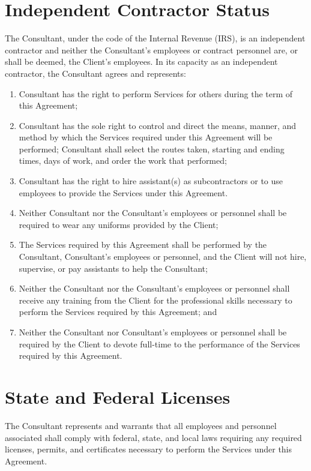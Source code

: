 \documentclass{article}
\begin{document}
\section{Independent Contractor Status}
The Consultant, under the code of the Internal Revenue (IRS), is an independent contractor and neither the Consultant's employees or contract personnel are, or shall be deemed, the Client's employees. In its capacity as an independent contractor, the Consultant agrees and represents:
\begin{enumerate}
    \item Consultant has the right to perform Services for others during the term of this Agreement;
    \item Consultant has the sole right to control and direct the means, manner, and method by which the Services required under this Agreement will be performed; Consultant shall select the routes taken, starting and ending times, days of work, and order the work that performed;
    \item Consultant has the right to hire assistant(s) as subcontractors or to use employees to provide the Services under this Agreement.
    \item Neither Consultant nor the Consultant's employees or personnel shall be required to wear any uniforms provided by the Client;
    \item The Services required by this Agreement shall be performed by the Consultant, Consultant's employees or personnel, and the Client will not hire, supervise, or pay assistants to help the Consultant;
    \item Neither the Consultant nor the Consultant's employees or personnel shall receive any training from the Client for the professional skills necessary to perform the Services required by this Agreement; and
    \item Neither the Consultant nor Consultant's employees or personnel shall be required by the Client to devote full-time to the performance of the Services required by this Agreement.
\end{enumerate}

\section{State and Federal Licenses}

The Consultant represents and warrants that all employees and personnel associated shall comply with federal, state, and local laws requiring any required licenses, permits, and certificates necessary to perform the Services under this Agreement.
\end{document}
